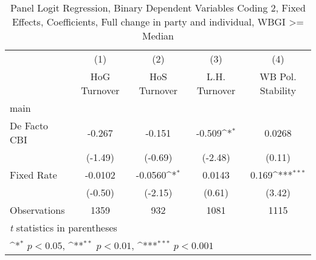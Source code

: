 \begin{table}[htbp]\centering
\def\sym#1{\ifmmode^{#1}\else\(^{#1}\)\fi}
\caption{Panel Logit Regression, Binary Dependent Variables Coding 2, Fixed Effects, Coefficients, Full change in party and individual, WBGI >= Median \label{logitFEMultInd2DF}}
\begin{tabular}{l*{4}{c}}
\toprule
                                        &\multicolumn{1}{c}{(1)}&\multicolumn{1}{c}{(2)}&\multicolumn{1}{c}{(3)}&\multicolumn{1}{c}{(4)}\\
                                        &\multicolumn{1}{c}{HoG Turnover}&\multicolumn{1}{c}{HoS Turnover}&\multicolumn{1}{c}{L.H. Turnover}&\multicolumn{1}{c}{WB Pol. Stability}\\
\midrule
main                                    &                  &                  &                  &                  \\
De Facto CBI                            &   -0.267         &   -0.151         &   -0.509\sym{*}  &   0.0268         \\
                                        &  (-1.49)         &  (-0.69)         &  (-2.48)         &   (0.11)         \\
\addlinespace
Fixed Rate                              &  -0.0102         &  -0.0560\sym{*}  &   0.0143         &    0.169\sym{***}\\
                                        &  (-0.50)         &  (-2.15)         &   (0.61)         &   (3.42)         \\
\midrule
Observations                            &     1359         &      932         &     1081         &     1115         \\
\bottomrule
\multicolumn{5}{l}{\footnotesize \textit{t} statistics in parentheses}\\
\multicolumn{5}{l}{\footnotesize \sym{*} \(p<0.05\), \sym{**} \(p<0.01\), \sym{***} \(p<0.001\)}\\
\end{tabular}
\end{table}
